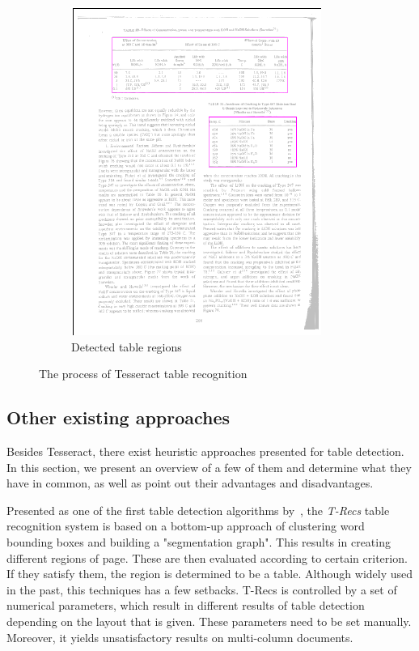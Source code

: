 \begin{figure}
\begin{subfigure}{0.30\textwidth}
\includegraphics[width=\linewidth]{img/tableDetection/tableDetectionResult.pdf}
\caption{Detected table regions}
\label{fig:tessTableDet5}
\end{subfigure}
\caption{The process of Tesseract table recognition}
\label{fig:tesseractTableRecognition}
\end{figure}

\subsection{Other existing approaches}

Besides Tesseract, there exist heuristic approaches presented for table detection. In this section, we present an overview of a few of them and determine what they have in common, as well as point out their advantages and disadvantages.

Presented as one of the first table detection algorithms by~\citet{TRecs}, the \emph{T-Recs} table recognition system is based on a bottom-up approach of clustering word bounding boxes and building a "segmentation graph". This results in creating different regions of page. These are then evaluated according to certain criterion. If they satisfy them, the region is determined to be a table. Although widely used in the past, this techniques has a few setbacks. T-Recs is controlled by a set of numerical parameters, which result in different results of table detection depending on the layout that is given. These parameters need to be set manually. Moreover, it yields unsatisfactory results on multi-column documents.

